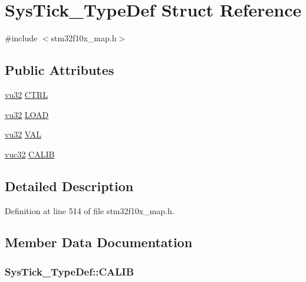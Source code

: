 \hypertarget{struct_sys_tick___type_def}{}\section{Sys\+Tick\+\_\+\+Type\+Def Struct Reference}
\label{struct_sys_tick___type_def}


{\ttfamily \#include $<$stm32f10x\+\_\+map.\+h$>$}

\subsection*{Public Attributes}
\begin{DoxyCompactItemize}
\item 
\hyperlink{agilefox_2library_2inc_2stm32f10x__type_8h_a6e2761f0a1011f84ed96b946f2c8a563}{vu32} \hyperlink{struct_sys_tick___type_def_a3838cc3b90d811a73c6e8761591dc991}{C\+T\+RL}
\item 
\hyperlink{agilefox_2library_2inc_2stm32f10x__type_8h_a6e2761f0a1011f84ed96b946f2c8a563}{vu32} \hyperlink{struct_sys_tick___type_def_a09d0c60cc8b23be6cf34cffecacda090}{L\+O\+AD}
\item 
\hyperlink{agilefox_2library_2inc_2stm32f10x__type_8h_a6e2761f0a1011f84ed96b946f2c8a563}{vu32} \hyperlink{struct_sys_tick___type_def_ae1e7f1e5e25b16bc0a3c4ba4ff61aafc}{V\+AL}
\item 
\hyperlink{agilefox_2library_2inc_2stm32f10x__type_8h_aafafa689bea126b0ac382c789206f51e}{vuc32} \hyperlink{struct_sys_tick___type_def_adb426e1a6d0a75b892307f11e7ea9f18}{C\+A\+L\+IB}
\end{DoxyCompactItemize}


\subsection{Detailed Description}


Definition at line 514 of file stm32f10x\+\_\+map.\+h.



\subsection{Member Data Documentation}
\subsubsection[{\texorpdfstring{C\+A\+L\+IB}{CALIB}}]{ Sys\+Tick\+\_\+\+Type\+Def\+::\+C\+A\+L\+IB}\hypertarget{struct_sys_tick___type_def_adb426e1a6d0a75b892307f11e7ea9f18}{}\label{struct_sys_tick___type_def_adb426e1a6d0a75b892307f11e7ea9f18}


